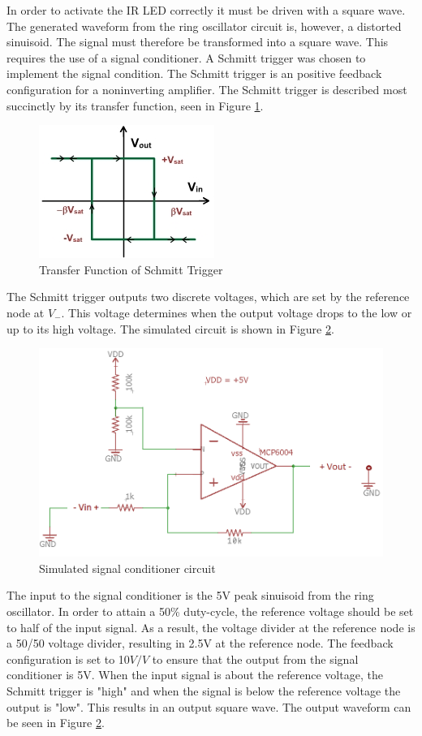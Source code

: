 
In order to activate the IR LED correctly it must be driven with a square wave. The generated waveform from the ring oscillator circuit is, however, a distorted sinuisoid. The signal must therefore be transformed into a square wave. This requires the use of a signal conditioner. A Schmitt trigger was chosen to implement the signal condition. 
The Schmitt trigger is an positive feedback configuration for a noninverting amplifier. The Schmitt trigger is described most succinctly by its transfer function, seen in Figure \ref{fig:schmitttransfer}.

\begin{figure}[H]
	\centering
	\includegraphics[width=0.4\linewidth]{CircuitDevelopment/schmitttransfer}
	\caption[Transfer function of Schmitt Trigger]{Transfer Function of Schmitt Trigger \cite{schmitt}}
	\label{fig:schmitttransfer}
\end{figure}
The Schmitt trigger outputs two discrete voltages, which are set by the reference node at $V_-$. This voltage determines when the output voltage drops to the low or up to its high voltage. The simulated circuit is shown in Figure \ref{fig:signalconditionersimulationschem}.

\begin{figure}[H]
	\centering
	\includegraphics[width=0.6\linewidth]{CIrcuitDevelopment/SignalConditionerSimulationSchem}
	\caption[Simulated signal conditioner circuit]{Simulated signal conditioner circuit}
	\label{fig:signalconditionersimulationschem}
\end{figure}

The input to the signal conditioner is the 5V peak sinuisoid from the ring oscillator. In order to attain a 50\% duty-cycle, the reference voltage should be set to half of the input signal. As a result, the voltage divider at the reference node is a 50/50 voltage divider, resulting in 2.5V at the reference node. The feedback configuration is set to 10$V/V$ to ensure that the output from the signal conditioner is 5V. When the input signal is about the reference voltage, the Schmitt trigger is "high" and when the signal is below the reference voltage the output is "low". This results in an output square wave. The output waveform can be seen in Figure \ref{fig:signalconditionersimulationschem}.

